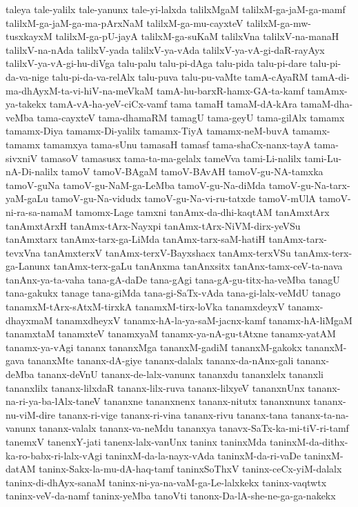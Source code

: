 {taleya
tale-yalilx
tale-yanunx
tale-yi-lalxda
talilxMgaM
talilxM-ga-jaM-ga-mamf
talilxM-ga-jaM-ga-ma-pArxNaM
talilxM-ga-mu-cayxteV
talilxM-ga-mw-tusxkayxM
talilxM-ga-pU-jayA
talilxM-ga-suKaM
talilxVna
talilxV-na-manaH
talilxV-na-nAda
talilxV-yada
talilxV-ya-vAda
talilxV-ya-vA-gi-daR-rayAyx
talilxV-ya-vA-gi-hu-diVga
talu-palu
talu-pi-dAga
talu-pida
talu-pi-dare
talu-pi-da-va-nige
talu-pi-da-va-relAlx
talu-puva
talu-pu-vaMte
tamA-cAyaRM
tamA-di-ma-dhAyxM-ta-vi-hiV-na-meVkaM
tamA-hu-barxR-hamx-GA-ta-kamf
tamAmx-ya-takekx
tamA-vA-ha-yeV-ciCx-vamf
tama
tamaH
tamaM-dA-kAra
tamaM-dha-veMba
tama-cayxteV
tama-dhamaRM
tamagU
tama-geyU
tama-gilAlx
tamamx
tamamx-Diya
tamamx-Di-yalilx
tamamx-TiyA
tamamx-neM-buvA
tamamx-tamamx
tamamxya
tama-sUnu
tamasaH
tamasf
tama-shaCx-nanx-tayA
tama-sivxniV
tamasoV
tamasusx
tama-ta-ma-gelalx
tameVva
tami-Li-nalilx
tami-Lu-nA-Di-nalilx
tamoV
tamoV-BAgaM
tamoV-BAvAH
tamoV-gu-NA-tamxka
tamoV-guNa
tamoV-gu-NaM-ga-LeMba
tamoV-gu-Na-diMda
tamoV-gu-Na-tarx-yaM-gaLu
tamoV-gu-Na-vidudx
tamoV-gu-Na-vi-ru-tatxde
tamoV-mUlA
tamoV-ni-ra-sa-namaM
tamomx-Lage
tamxni
tanAmx-da-dhi-kaqtAM
tanAmxtArx
tanAmxtArxH
tanAmx-tArx-Nayxpi
tanAmx-tArx-NiVM-dirx-yeVSu
tanAmxtarx
tanAmx-tarx-ga-LiMda
tanAmx-tarx-saM-hatiH
tanAmx-tarx-tevxVna
tanAmxterxV
tanAmx-terxV-Bayxshacx
tanAmx-terxVSu
tanAmx-terx-ga-Lanunx
tanAmx-terx-gaLu
tanAnxma
tanAnxsitx
tanAnx-tamx-ceV-ta-nava
tanAnx-ya-ta-vaha
tana-gA-daDe
tana-gAgi
tana-gA-gu-titx-ha-veMba
tanagU
tana-gakukx
tanage
tana-giMda
tana-gi-SaTx-vAda
tana-gi-lalx-veMdU
tanago
tanamxM-tArx-sAtxM-tirxkA
tanamxM-tirx-loVka
tanamxdeyxV
tanamx-dhayxmaM
tanamxdheyxV
tanamx-hA-la-ya-saM-jacnx-kamf
tanamx-hA-liMgaM
tanamxtaM
tanamxteV
tanamxyaM
tanamx-ya-nA-gu-tAtxne
tanamx-yatAM
tanamx-ya-vAgi
tananx
tananxMga
tananxM-gadiM
tananxM-gakokx
tananxM-gava
tananxMte
tananx-dA-giye
tananx-dalalx
tananx-da-nAnx-gali
tananx-deMba
tananx-deVnU
tananx-de-lalx-vanunx
tananxdu
tananxlelx
tananxli
tananxlilx
tananx-lilxdaR
tananx-lilx-ruva
tananx-lilxyeV
tananxnUnx
tananx-na-ri-ya-ba-lAlx-taneV
tananxne
tananxnenx
tananx-nitutx
tananxnunx
tananx-nu-viM-dire
tananx-ri-vige
tananx-ri-vina
tananx-rivu
tananx-tana
tananx-ta-na-vanunx
tananx-valalx
tananx-va-neMdu
tananxya
tanavx-SaTx-ka-mi-tiV-ri-tamf
tanemxV
tanenxY-jati
tanenx-lalx-vanUnx
taninx
taninxMda
taninxM-da-dithx-ka-ro-babx-ri-lalx-vAgi
taninxM-da-la-nayx-vAda
taninxM-da-ri-vaDe
taninxM-datAM
taninx-Sakx-la-mu-dA-haq-tamf
taninxSoThxV
taninx-ceCx-yiM-dalalx
taninx-di-dhAyx-sanaM
taninx-ni-ya-na-vaM-ga-Le-lalxkekx
taninx-vaqtwtx
taninx-veV-da-namf
taninx-yeMba
tanoVti
tanonx-Da-lA-she-ne-ga-ga-nakekx
}
